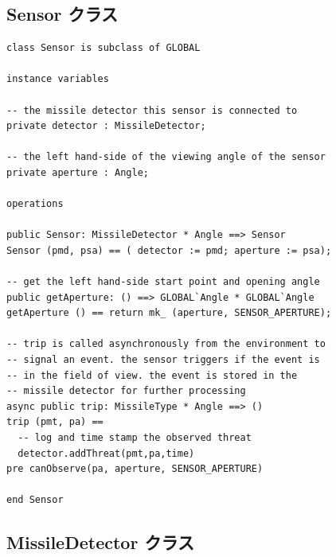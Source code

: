 \documentclass[\pformat,12pt]{jreport}
\begin{document}
\subsection{Sensor クラス}

\begin{lstlisting}
class Sensor is subclass of GLOBAL

instance variables

-- the missile detector this sensor is connected to
private detector : MissileDetector;

-- the left hand-side of the viewing angle of the sensor
private aperture : Angle;

operations

public Sensor: MissileDetector * Angle ==> Sensor
Sensor (pmd, psa) == ( detector := pmd; aperture := psa);

-- get the left hand-side start point and opening angle
public getAperture: () ==> GLOBAL`Angle * GLOBAL`Angle
getAperture () == return mk_ (aperture, SENSOR_APERTURE);

-- trip is called asynchronously from the environment to
-- signal an event. the sensor triggers if the event is
-- in the field of view. the event is stored in the
-- missile detector for further processing
async public trip: MissileType * Angle ==> ()
trip (pmt, pa) ==
  -- log and time stamp the observed threat
  detector.addThreat(pmt,pa,time)
pre canObserve(pa, aperture, SENSOR_APERTURE)

end Sensor
\end{lstlisting}

\subsection{MissileDetector クラス}
\end{document}
